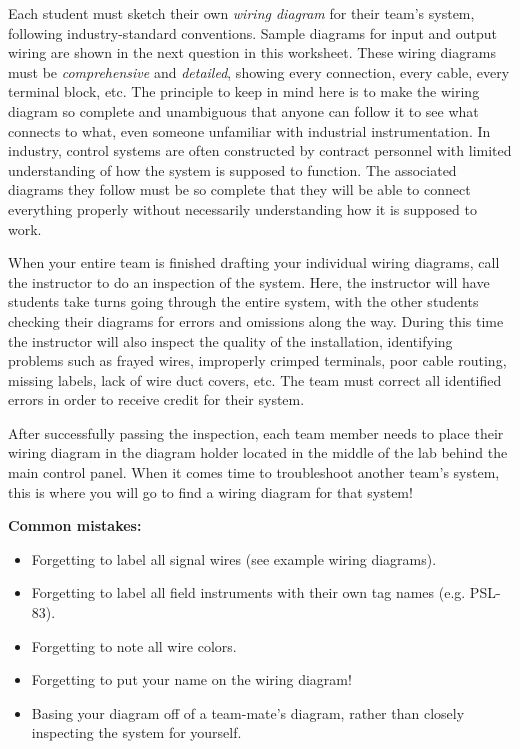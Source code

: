 \vskip 5pt

Each student must sketch their own {\it wiring diagram} for their team's system, following industry-standard conventions.  Sample diagrams for input and output wiring are shown in the next question in this worksheet.  These wiring diagrams must be {\it comprehensive} and {\it detailed}, showing every connection, every cable, every terminal block, etc.  The principle to keep in mind here is to make the wiring diagram so complete and unambiguous that anyone can follow it to see what connects to what, even someone unfamiliar with industrial instrumentation.  In industry, control systems are often constructed by contract personnel with limited understanding of how the system is supposed to function.  The associated diagrams they follow must be so complete that they will be able to connect everything properly without necessarily understanding how it is supposed to work.

When your entire team is finished drafting your individual wiring diagrams, call the instructor to do an inspection of the system.  Here, the instructor will have students take turns going through the entire system, with the other students checking their diagrams for errors and omissions along the way.  During this time the instructor will also inspect the quality of the installation, identifying problems such as frayed wires, improperly crimped terminals, poor cable routing, missing labels, lack of wire duct covers, etc.  The team must correct all identified errors in order to receive credit for their system.  

After successfully passing the inspection, each team member needs to place their wiring diagram in the diagram holder located in the middle of the lab behind the main control panel.  When it comes time to troubleshoot another team's system, this is where you will go to find a wiring diagram for that system!

\vskip 10pt

{\bf Common mistakes:}

\begin{itemize}
\item{} Forgetting to label all signal wires (see example wiring diagrams).
\item{} Forgetting to label all field instruments with their own tag names (e.g. PSL-83).
\item{} Forgetting to note all wire colors.
\item{} Forgetting to put your name on the wiring diagram!
\item{} Basing your diagram off of a team-mate's diagram, rather than closely inspecting the system for yourself.
\end{itemize}

